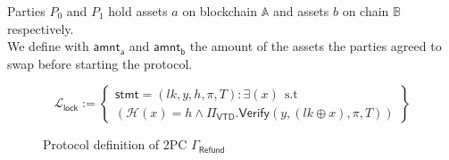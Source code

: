 \documentclass{article}      	%
\begin{document}
Parties $P_0$ and $P_1$ hold assets $a$ on blockchain $\mathbb{A}$ and assets $b$ on chain $\mathbb{B}$ respectively. \\
We define with $\mathsf{amnt_a}$ and $\mathsf{amnt_b}$ the amount of the assets the parties agreed to swap before starting the protocol.

\[
    \mathcal{L}_{\mathsf{lock}} := \left\{\begin{array}{lr}  \mathsf{stmt} = (lk, y, h, \pi, T) : \exists (x) \:\: \text{s.t} \\
    (\mathcal{H}(x) = h \land \Pi_\mathsf{VTD}.\mathsf{Verify}(y, (lk \oplus x), \pi, T)) \end{array}\right\}
\]

\begin{figure}[H]
\begin{pchstack}
\end{pchstack}
\caption{Protocol definition of 2PC $\Gamma_{\mathsf{Refund}}$}
\end{figure}
\end{document}
